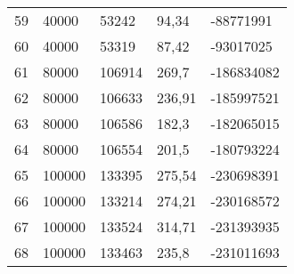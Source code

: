 \begin{longtable}{lllll}
    59               & 40000          & 53242          & 94,34     & -88771991       \\
    60               & 40000          & 53319          & 87,42     & -93017025       \\
    61               & 80000          & 106914         & 269,7     & -186834082      \\
    62               & 80000          & 106633         & 236,91    & -185997521      \\
    63               & 80000          & 106586         & 182,3     & -182065015      \\
    64               & 80000          & 106554         & 201,5     & -180793224      \\
    65               & 100000         & 133395         & 275,54    & -230698391      \\
    66               & 100000         & 133214         & 274,21    & -230168572      \\
    67               & 100000         & 133524         & 314,71    & -231393935      \\
    68               & 100000         & 133463         & 235,8     & -231011693      
\end{longtable}

